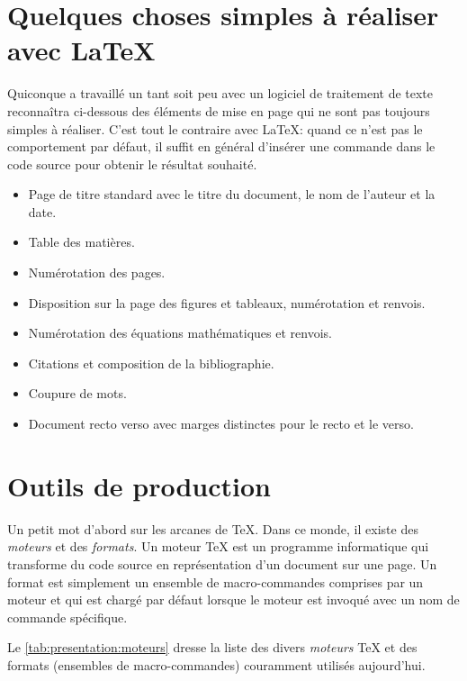 \section{Quelques choses simples à réaliser avec {\LaTeX}}

Quiconque a travaillé un tant soit peu avec un logiciel de traitement
de texte reconnaîtra ci-dessous des éléments de mise en page qui ne
sont pas toujours simples à réaliser. C'est tout le contraire avec
{\LaTeX}: quand ce n'est pas le comportement par défaut, il suffit en
général d'insérer une commande dans le code source pour obtenir le
résultat souhaité.

\begin{itemize}
\item Page de titre standard avec le titre du document, le nom de
  l'auteur et la date.
\item Table des matières.
\item Numérotation des pages.
\item Disposition sur la page des figures et tableaux, numérotation et
  renvois.
\item Numérotation des équations mathématiques et renvois.
\item Citations et composition de la bibliographie.
\item Coupure de mots.
\item Document recto verso avec marges distinctes pour le recto et le
  verso.
\end{itemize}


\section{Outils de production}

Un petit mot d'abord sur les arcanes de {\TeX}. Dans ce monde, il
existe des \emph{moteurs} et des \emph{formats}. Un moteur {\TeX} est
un programme informatique qui transforme du code source en
représentation d'un document sur une page. Un format est simplement un
ensemble de macro-commandes comprises par un moteur et qui est chargé
par défaut lorsque le moteur est invoqué avec un nom de commande
spécifique.

Le \autoref{tab:presentation:moteurs} dresse la liste des divers
\emph{moteurs} {\TeX} et des formats (ensembles de macro-commandes)
couramment utilisés aujourd'hui.

